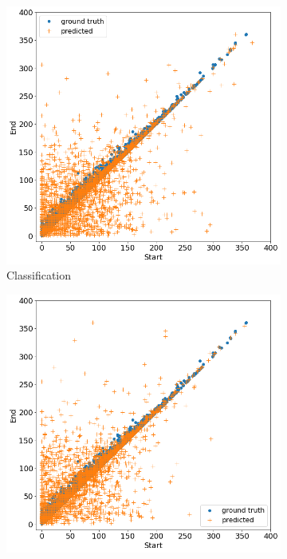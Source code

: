 \documentclass{article}
\begin{document}
\begin{figure}[!ht]
\begin{subfigure}{0.5\textwidth}
\centering
\includegraphics[width=1\textwidth]{RNN_classification_precedence.png}
\caption{Classification}
\label{fig2:sub1}
\end{subfigure}%
\begin{subfigure}{0.5\textwidth}
\centering
\includegraphics[width=1\textwidth]{RNN_constraint_precedence.png}

\end{subfigure}
\end{figure}
\end{document}
